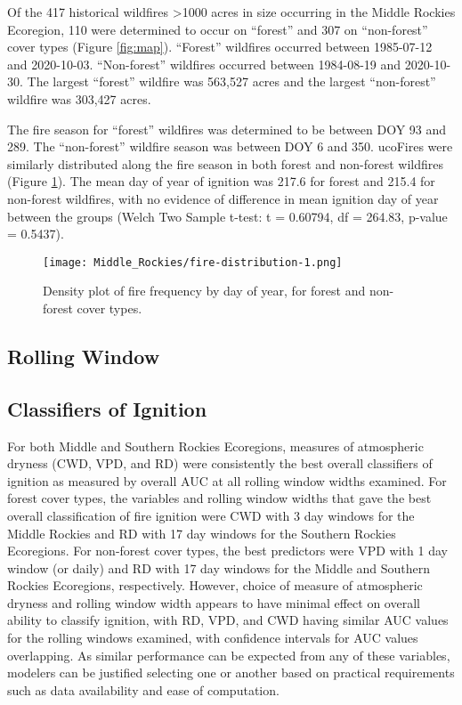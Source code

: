 \documentclass{article}
\begin{document}
Of the 417 historical wildfires \textgreater1000 acres in size occurring in the Middle Rockies Ecoregion, 110 were determined to occur on ``forest'' and 307 on ``non-forest'' cover types (Figure \ref{fig:map}).  ``Forest'' wildfires occurred between 1985-07-12 and 2020-10-03.  ``Non-forest'' wildfires occurred between 1984-08-19 and 2020-10-30.  The largest ``forest'' wildfire was 563,527 acres and the largest ``non-forest'' wildfire was 303,427 acres.

The fire season for ``forest'' wildfires was determined to be between DOY 93 and 289.  The ``non-forest'' wildfire season was between DOY 6 and 350.  ucoFires were similarly distributed along the fire season in both forest and non-forest wildfires (Figure \ref{fig:fire-dens}). The mean day of year of ignition was 217.6 for forest and 215.4 for non-forest wildfires, with no evidence of difference in mean ignition day of year between the groups (Welch Two Sample t-test: t = 0.60794, df = 264.83, p-value = 0.5437).

\begin{figure}[ht]
  \texttt{[image: Middle\_Rockies/fire-distribution-1.png]}
  \caption{Density plot of fire frequency by day of year, for forest and non-forest cover types.}
  \label{fig:fire-dens}
\end{figure}


\subsection{Rolling Window}
\subsection{Classifiers of Ignition}

For both Middle and Southern Rockies Ecoregions, measures of atmospheric dryness (CWD, VPD, and RD) were consistently the best overall classifiers of ignition as measured by overall AUC at all rolling window widths examined.  For forest cover types, the variables and rolling window widths that gave the best overall classification of fire ignition were CWD with 3 day windows for the Middle Rockies and RD with 17 day windows for the Southern Rockies Ecoregions.  For non-forest cover types, the best predictors were VPD with 1 day window (or daily) and RD with 17 day windows for the Middle and Southern Rockies Ecoregions, respectively.  However, choice of measure of atmospheric dryness and rolling window width appears to have minimal effect on overall ability to classify ignition, with RD, VPD, and CWD having similar AUC values for the rolling windows examined, with confidence intervals for AUC values overlapping.  As similar performance can be expected from any of these variables, modelers can be justified selecting one or another based on practical requirements such as data availability and ease of computation.
\end{document}
